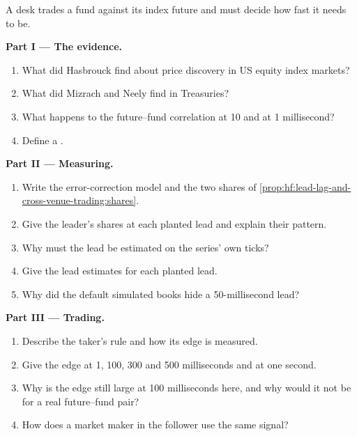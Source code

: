 \begin{problem}\label{pb:hf:lead-lag-and-cross-venue-trading:1}
A desk trades a fund against its index future and must decide how fast it needs to be.

\medskip\noindent\textbf{Part I --- The evidence.}
\begin{enumerate}
\item What did Hasbrouck find about price discovery in US equity index markets?
\item What did Mizrach and Neely find in Treasuries?
\item What happens to the future--fund correlation at 10 and at 1 millisecond?
\item Define a .
\end{enumerate}

\medskip\noindent\textbf{Part II --- Measuring.}
\begin{enumerate}[resume]
\item Write the error-correction model and the two shares of \cref{prop:hf:lead-lag-and-cross-venue-trading:shares}.
\item Give the leader's shares at each planted lead and explain their pattern.
\item Why must the lead be estimated on the series' own ticks?
\item Give the lead estimates for each planted lead.
\item Why did the default simulated books hide a 50-millisecond lead?
\end{enumerate}

\medskip\noindent\textbf{Part III --- Trading.}
\begin{enumerate}[resume]
\item Describe the taker's rule and how its edge is measured.
\item Give the edge at 1, 100, 300 and 500 milliseconds and at one second.
\item Why is the edge still large at 100 milliseconds here, and why would it not be for a real future--fund pair?
\item How does a market maker in the follower use the same signal?
\end{enumerate}


\end{problem}
